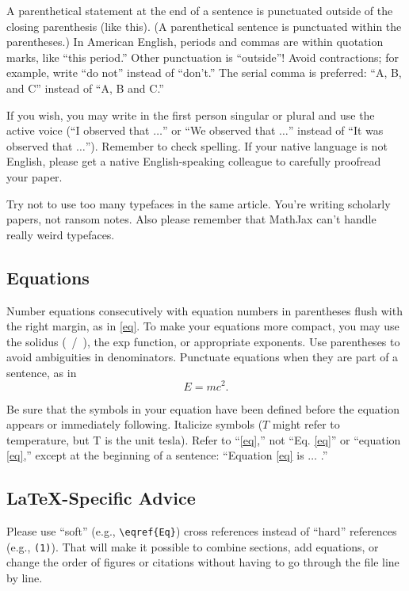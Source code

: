 \documentclass{ieeeaccess}
\begin{document}
A parenthetical statement at the end of a sentence is punctuated outside of 
the closing parenthesis (like this). (A parenthetical sentence is punctuated 
within the parentheses.) In American English, periods and commas are within 
quotation marks, like ``this period.'' Other punctuation is ``outside''! 
Avoid contractions; for example, write ``do not'' instead of ``don't.'' The 
serial comma is preferred: ``A, B, and C'' instead of ``A, B and C.''

If you wish, you may write in the first person singular or plural and use 
the active voice (``I observed that $\ldots$'' or ``We observed that $\ldots$'' 
instead of ``It was observed that $\ldots$''). Remember to check spelling. If 
your native language is not English, please get a native English-speaking 
colleague to carefully proofread your paper.

Try not to use too many typefaces in the same article. You're writing
scholarly papers, not ransom notes. Also please remember that MathJax
can't handle really weird typefaces.

\subsection{Equations}
Number equations consecutively with equation numbers in parentheses flush 
with the right margin, as in \eqref{eq}. To make your equations more 
compact, you may use the solidus (~/~), the exp function, or appropriate 
exponents. Use parentheses to avoid ambiguities in denominators. Punctuate 
equations when they are part of a sentence, as in
\begin{equation}E=mc^2.\label{eq}\end{equation}

Be sure that the symbols in your equation have been defined before the 
equation appears or immediately following. Italicize symbols ($T$ might refer 
to temperature, but T is the unit tesla). Refer to ``\eqref{eq},'' not ``Eq. \eqref{eq}'' 
or ``equation \eqref{eq},'' except at the beginning of a sentence: ``Equation \eqref{eq} 
is $\ldots$ .''

\subsection{\LaTeX-Specific Advice}

Please use ``soft'' (e.g., \verb|\eqref{Eq}|) cross references instead
of ``hard'' references (e.g., \verb|(1)|). That will make it possible
to combine sections, add equations, or change the order of figures or
citations without having to go through the file line by line.
\end{document}
